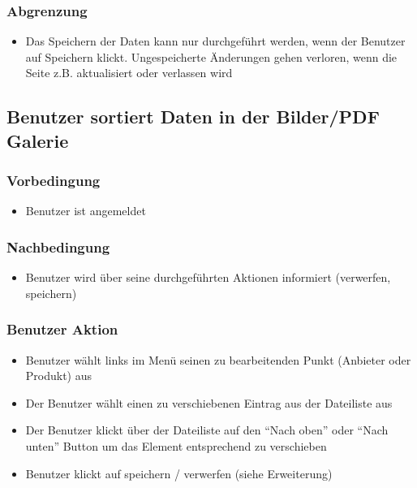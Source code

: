 \documentclass[a4paper,12pt]{article}
\begin{document}
\subsubsection{Abgrenzung}\label{abgrenzung-5}

\begin{itemize}

\item
  Das Speichern der Daten kann nur durchgeführt werden, wenn der
  Benutzer auf Speichern klickt. Ungespeicherte Änderungen gehen
  verloren, wenn die Seite z.B. aktualisiert oder verlassen wird
\end{itemize}

\subsection{Benutzer sortiert Daten in der Bilder/PDF Galerie}\label{benutzer-sortiert-daten-in-der-bilderpdf-galerie}

\subsubsection{Vorbedingung}\label{vorbedingung-6}

\begin{itemize}

\item
  Benutzer ist angemeldet
\end{itemize}

\subsubsection{Nachbedingung}\label{nachbedingung-6}

\begin{itemize}

\item
  Benutzer wird über seine durchgeführten Aktionen informiert
  (verwerfen, speichern)
\end{itemize}

\subsubsection{Benutzer Aktion}\label{benutzer-aktion-6}

\begin{itemize}

\item
  Benutzer wählt links im Menü seinen zu bearbeitenden Punkt (Anbieter
  oder Produkt) aus
\item
  Der Benutzer wählt einen zu verschiebenen Eintrag aus der Dateiliste
  aus
\item
  Der Benutzer klickt über der Dateiliste auf den ``Nach oben'' oder
  ``Nach unten'' Button um das Element entsprechend zu verschieben
\item
  Benutzer klickt auf speichern / verwerfen (siehe Erweiterung)
\end{itemize}
\end{document}
